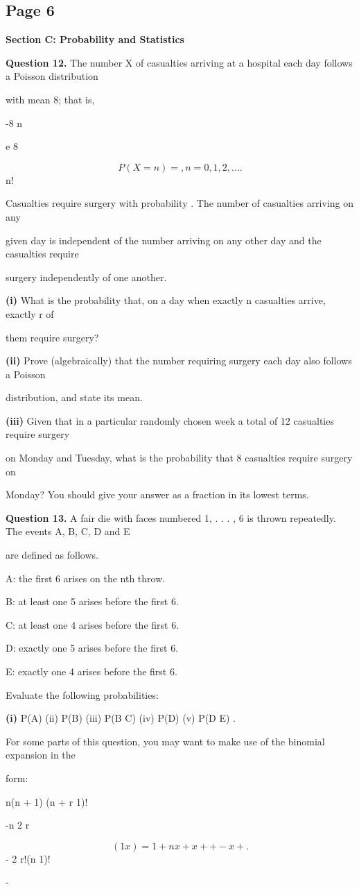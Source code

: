\documentclass[12pt]{article}
\begin{document}
\subsection*{Page 6}
\begin{flushleft}
\bigskip\textbf{Section C: Probability and Statistics}\par
\bigskip\textbf{Question 12.} The number X of casualties arriving at a hospital each day follows a Poisson distribution\par
with mean 8; that is,\par
-8 n\par
e 8\par
\[P(X = n) = , n = 0, 1, 2, . . . .\]
n!\par
Casualties require surgery with probability . The number of casualties arriving on any\par
given day is independent of the number arriving on any other day and the casualties require\par
surgery independently of one another.\par
\textbf{(i)} What is the probability that, on a day when exactly n casualties arrive, exactly r of\par
them require surgery?\par
\textbf{(ii)} Prove (algebraically) that the number requiring surgery each day also follows a Poisson\par
distribution, and state its mean.\par
\textbf{(iii)} Given that in a particular randomly chosen week a total of 12 casualties require surgery\par
on Monday and Tuesday, what is the probability that 8 casualties require surgery on\par
Monday? You should give your answer as a fraction in its lowest terms.\par
\bigskip\textbf{Question 13.} A fair die with faces numbered 1, . . . , 6 is thrown repeatedly. The events A, B, C, D and E\par
are defined as follows.\par
A: the first 6 arises on the nth throw.\par
B: at least one 5 arises before the first 6.\par
C: at least one 4 arises before the first 6.\par
D: exactly one 5 arises before the first 6.\par
E: exactly one 4 arises before the first 6.\par
Evaluate the following probabilities:\par
\textbf{(i)} P(A) (ii) P(B) (iii) P(B C) (iv) P(D) (v) P(D E) .\par
\cap \cup\par
For some parts of this question, you may want to make use of the binomial expansion in the\par
form:\par
n(n + 1) (n + r 1)!\par
-n 2 r\par
\[(1 x) = 1 + nx + x + + - x + .\]
- 2 \cdots r!(n 1)! \cdots\par
-\par
\end{flushleft}
\end{document}
